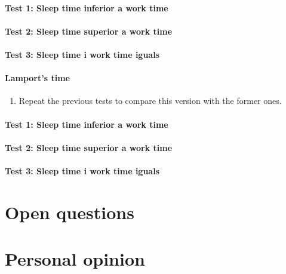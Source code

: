 \documentclass[a4paper, 10pt]{article}
\begin{document}
\paragraph[bold]{Test 1: Sleep time inferior a work time}
\paragraph[bold]{Test 2: Sleep time superior a work time}
\paragraph[bold]{Test 3: Sleep time i work time iguals}


\paragraph[bold]{Lamport’s time}
\begin{enumerate}
\item Repeat the previous tests to compare this version with the former ones.
\end{enumerate}
\paragraph[bold]{Test 1: Sleep time inferior a work time}
\paragraph[bold]{Test 2: Sleep time superior a work time}
\paragraph[bold]{Test 3: Sleep time i work time iguals}


\newpage
\section{Open questions}
\begin{enumerate}
\end{enumerate}

\section{Personal opinion}
\end{document}
